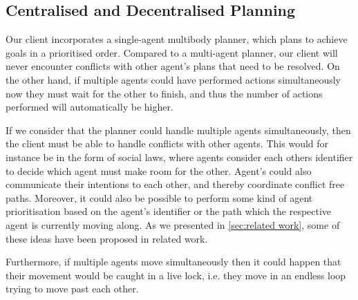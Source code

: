 \subsection{Centralised and Decentralised Planning}

Our client incorporates a single-agent multibody planner, which plans to achieve goals in a prioritised order.
Compared to a multi-agent planner, our client will never encounter conflicts with other agent's plans that need to be resolved.
On the other hand, if multiple agents could have performed actions simultaneously now they must wait for the other to finish, and thus the number of actions performed will automatically be higher.

If we consider that the planner could handle multiple agents simultaneously, then the client must be able to handle conflicts with other agents.
This would for instance be in the form of social laws, where agents consider each others identifier to decide which agent must make room for the other.
Agent's could also communicate their intentions to each other, and thereby coordinate conflict free paths.
Moreover, it could also be possible to perform some kind of agent prioritisation based on the agent's identifier or the path which the respective agent is currently moving along.
As we presented in \cref{sec:related work}, some of these ideas have been proposed in related work.

Furthermore, if multiple agents move simultaneously then it could happen that their movement would be caught in a live lock, i.e. they move in an endless loop trying to move past each other.
